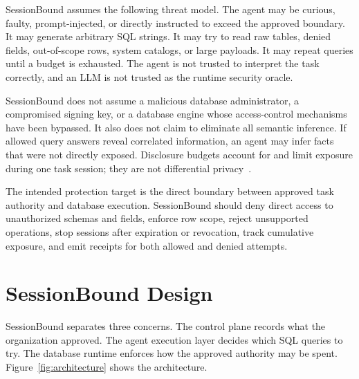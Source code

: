 \documentclass[10pt,twocolumn]{article}
\begin{document}
SessionBound assumes the following threat model. The agent may be
curious, faulty, prompt-injected, or directly instructed to exceed the
approved boundary. It may generate arbitrary SQL strings. It may try to
read raw tables, denied fields, out-of-scope rows, system catalogs, or
large payloads. It may repeat queries until a budget is exhausted. The
agent is not trusted to interpret the task correctly, and an LLM is not
trusted as the runtime security oracle.

SessionBound does not assume a malicious database administrator, a
compromised signing key, or a database engine whose access-control
mechanisms have been bypassed. It also does not claim to eliminate all
semantic inference. If allowed query answers reveal correlated
information, an agent may infer facts that were not directly exposed.
Disclosure budgets account for and limit exposure during one task
session; they are not differential privacy~\cite{dwork2014algorithmic}.

The intended protection target is the direct boundary between approved
task authority and database execution. SessionBound should deny direct
access to unauthorized schemas and fields, enforce row scope, reject
unsupported operations, stop sessions after expiration or revocation,
track cumulative exposure, and emit receipts for both allowed and
denied attempts.

\section{SessionBound Design}

SessionBound separates three concerns. The control plane records what
the organization approved. The agent execution layer decides which SQL
queries to try. The database runtime enforces how the approved authority
may be spent. Figure~\ref{fig:architecture} shows the architecture.
\end{document}
